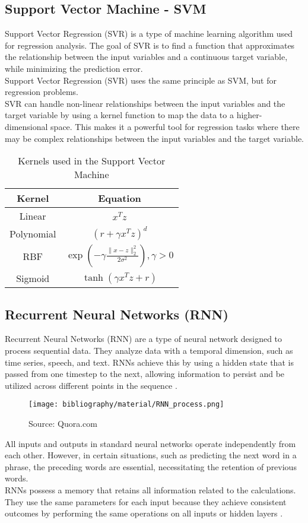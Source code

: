 \documentclass{ieeeojies}
\begin{document}
	\subsection{Support Vector Machine - SVM}
	Support Vector Regression (SVR) is a type of machine learning algorithm used for regression analysis. The goal of SVR is to find a function that approximates the relationship between the input variables and a continuous target variable, while minimizing the prediction error. \\
	Support Vector Regression (SVR) uses the same principle as SVM, but for regression problems.\\
	SVR can handle non-linear relationships between the input variables and the target variable by using a kernel function to map the data to a higher-dimensional space. This makes it a powerful tool for regression tasks where there may be complex relationships between the input variables and the target variable. \cite{b10}
	\begin{table}[H]
		\centering
		\caption{Kernels used in the Support Vector Machine}
		\begin{tabular}{|c|c|}
			\hline
			\textbf{Kernel} & \textbf{Equation} \\ \hline
			Linear & ${x^T z}$ \\ \hline
			Polynomial & $\left( r + \gamma {x^T z} \right)^d$ \\ \hline
			RBF & $\exp \left( -\gamma \frac{\|x - z\|_2^2}{2\sigma^2} \right), \gamma > 0$ \\ \hline
			Sigmoid & $\tanh \left( \gamma {x^T z} + r \right)$ \\ \hline
		\end{tabular}
	\end{table}
	
	\subsection{Recurrent Neural Networks (RNN)}
	Recurrent Neural Networks (RNN) are a type of neural network designed to process sequential data. They analyze data with a temporal dimension, such as time series, speech, and text. RNNs achieve this by using a hidden state that is passed from one timestep to the next, allowing information to persist and be utilized across different points in the sequence \cite{b11}.
	\begin{figure}[H] %
		\centering
		\texttt{[image: bibliography/material/RNN\_process.png]}
		\caption{Source: Quora.com}
	\end{figure}
	\noindent All inputs and outputs in standard neural networks operate independently from each other. However, in certain situations, such as predicting the next word in a phrase, the preceding words are essential, necessitating the retention of previous words.\\
	RNNs possess a memory that retains all information related to the calculations. They use the same parameters for each input because they achieve consistent outcomes by performing the same operations on all inputs or hidden layers \cite{b12}.
	
\end{document}
